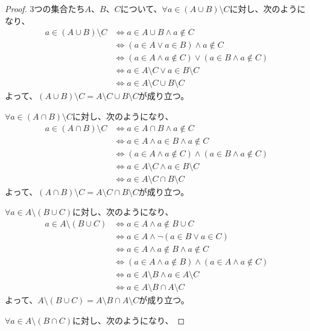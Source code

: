 \documentclass[a4paper]{jsarticle}
\begin{document}
\begin{proof}
3つの集合たち$A$、$B$、$C$について、$\forall a \in (A \cup B) \setminus C$に対し、次のようになり、
\begin{align*}
a \in (A \cup B) \setminus C &\Leftrightarrow a \in A \cup B \land a \notin C\\
&\Leftrightarrow (a \in A \vee a \in B) \land a \notin C\\
&\Leftrightarrow (a \in A \land a \notin C) \vee (a \in B \land a \notin C)\\
&\Leftrightarrow a \in A \setminus C \vee a \in B \setminus C\\
&\Leftrightarrow a \in A \setminus C \cup B \setminus C
\end{align*}
よって、$(A \cup B) \setminus C = A \setminus C \cup B \setminus C$が成り立つ。\par
$\forall a \in (A \cap B) \setminus C$に対し、次のようになり、
\begin{align*}
a \in (A \cap B) \setminus C &\Leftrightarrow a \in A \cap B \land a \notin C\\
&\Leftrightarrow a \in A \land a \in B \land a \notin C\\
&\Leftrightarrow (a \in A \land a \notin C) \land (a \in B \land a \notin C)\\
&\Leftrightarrow a \in A \setminus C \land a \in B \setminus C\\
&\Leftrightarrow a \in A \setminus C \cap B \setminus C
\end{align*}
よって、$(A \cap B) \setminus C = A \setminus C \cap B \setminus C$が成り立つ。\par
$\forall a \in A \setminus (B \cup C)$に対し、次のようになり、
\begin{align*}
a \in A \setminus (B \cup C) &\Leftrightarrow a \in A \land a \notin B \cup C\\
&\Leftrightarrow a \in A \land \neg(a \in B \vee a \in C)\\
&\Leftrightarrow a \in A \land a \notin B \land a \notin C\\
&\Leftrightarrow (a \in A \land a \notin B) \land (a \in A \land a \notin C)\\
&\Leftrightarrow a \in A \setminus B \land a \in A \setminus C\\
&\Leftrightarrow a \in A \setminus B \cap A \setminus C
\end{align*}
よって、$A \setminus (B \cup C) = A \setminus B \cap A \setminus C$が成り立つ。\par
$\forall a \in A \setminus (B \cap C)$に対し、次のようになり、

\end{proof}
\end{document}
